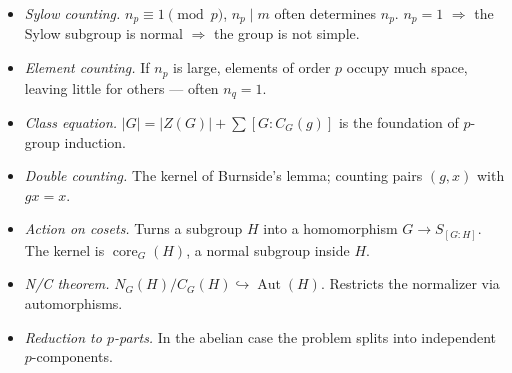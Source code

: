 \begin{itemize}
\item \textit{Sylow counting.} $n_p\equiv1\pmod p$, $n_p\mid m$ often determines $n_p$. $n_p=1$ $\Rightarrow$ the Sylow subgroup is normal $\Rightarrow$ the group is not simple.
\item \textit{Element counting.} If $n_p$ is large, elements of order $p$ occupy much space, leaving little for others --- often $n_q=1$.
\item \textit{Class equation.} $|G|=|Z(G)|+\sum[G:C_G(g)]$ is the foundation of $p$-group induction.
\item \textit{Double counting.} The kernel of Burnside's lemma; counting pairs $(g,x)$ with $gx=x$.
\item \textit{Action on cosets.} Turns a subgroup $H$ into a homomorphism $G\to S_{[G:H]}$. The kernel is $\operatorname{core}_G(H)$, a normal subgroup inside $H$.
\item \textit{N/C theorem.} $N_G(H)/C_G(H)\hookrightarrow\operatorname{Aut}(H)$. Restricts the normalizer via automorphisms.
\item \textit{Reduction to $p$-parts.} In the abelian case the problem splits into independent $p$-components.
\end{itemize}

